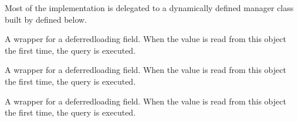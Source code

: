 \documentclass[letterpaper,10pt,french]{sphinxmanual}
\begin{document}
\begin{fulllineitems}
\begin{fulllineitems}
\sphinxAtStartPar
Most of the implementation is delegated to a dynamically defined manager
class built by  defined below.

\end{fulllineitems}


\begin{fulllineitems}
\label{\detokenize{main/model:main.models.Matiere.is_active}}
\pysigstartsignatures
{}
\pysigstopsignatures
\sphinxAtStartPar
A wrapper for a deferred\sphinxhyphen{}loading field. When the value is read from this
object the first time, the query is executed.

\end{fulllineitems}


\begin{fulllineitems}
\label{\detokenize{main/model:main.models.Matiere.is_available_to_add_evaluation}}
\pysigstartsignatures
{}
\pysigstopsignatures
\end{fulllineitems}


\begin{fulllineitems}
\label{\detokenize{main/model:main.models.Matiere.libelle}}
\pysigstartsignatures
{}
\pysigstopsignatures
\sphinxAtStartPar
A wrapper for a deferred\sphinxhyphen{}loading field. When the value is read from this
object the first time, the query is executed.

\end{fulllineitems}


\begin{fulllineitems}
\label{\detokenize{main/model:main.models.Matiere.minValue}}
\pysigstartsignatures
{}
\pysigstopsignatures
\sphinxAtStartPar
A wrapper for a deferred\sphinxhyphen{}loading field. When the value is read from this
object the first time, the query is executed.


\end{fulllineitems}
\end{fulllineitems}
\end{document}
